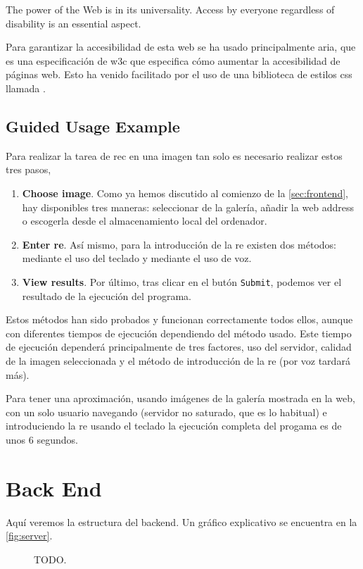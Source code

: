 \begin{quoteBox}
  The power of the Web is in its universality. Access by everyone regardless of
  disability is an essential aspect.
  \tcblower{}
\end{quoteBox}

Para garantizar la accesibilidad de esta web se ha usado principalmente
\gls{aria}, que es una especificación de \gls{w3c} que especifica cómo aumentar
la accesibilidad de páginas web. Esto ha venido facilitado por el uso de una
biblioteca de estilos \gls{css} llamada
.

\subsection{Guided Usage Example}

Para realizar la tarea de \gls{rec} en una imagen tan solo es necesario
realizar estos tres pasos,
\begin{enumerate}
  \item \textbf{Choose image}. Como ya hemos discutido al comienzo de la
  \vref{sec:frontend}, hay disponibles tres maneras: seleccionar de la galería,
  añadir la web address o escogerla desde el almacenamiento local del
  ordenador.
  \item \textbf{Enter \gls*{re}}. Así mismo, para la introducción de la
  \gls{re} existen dos métodos: mediante el uso del teclado y mediante el uso
  de voz.
  \item \textbf{View results}. Por último, tras clicar en el butón
  \texttt{Submit}, podemos ver el resultado de la ejecución del programa.
\end{enumerate}

Estos métodos han sido probados y funcionan correctamente todos ellos, aunque
con diferentes tiempos de ejecución dependiendo del método usado. Este tiempo
de ejecución dependerá principalmente de tres factores, uso del servidor,
calidad de la imagen seleccionada y el método de introducción de la \gls{re}
(por voz tardará más).

\begin{exampleBox}
  Para tener una aproximación, usando imágenes de la galería mostrada en la
  web, con un solo usuario navegando (servidor no saturado, que es lo habitual)
  e introduciendo la \gls{re} usando el teclado la ejecución completa del
  progama es de unos 6 segundos.
\end{exampleBox}


\section{Back End}\label{sec:backend}

Aquí veremos la estructura del backend. Un gráfico explicativo se encuentra en
la \vref{fig:server}.

\begin{figure}[ht]
  \centering
  
  \caption[TODO]{TODO.}\label{fig:server}
\end{figure}
